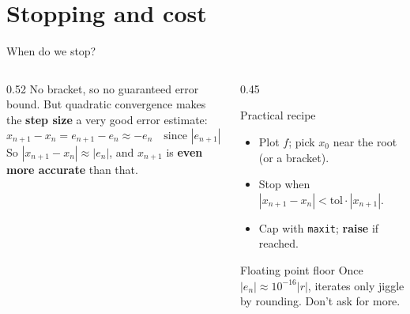 \documentclass[aspectratio=169]{beamer}
\begin{document}
\section{Stopping and cost}

\begin{frame}{When do we stop?}
\begin{columns}[T]
\begin{column}{0.52\textwidth}
\small
No bracket, so no guaranteed error bound. But quadratic convergence makes the \textbf{step size} a very good error estimate:
\[
x_{n+1} - x_n = e_{n+1} - e_n \approx -e_n
\quad\text{since } |e_{n+1}| \ll |e_n|.
\]
So $|x_{n+1} - x_n| \approx |e_n|$, and $x_{n+1}$ is \textbf{even more accurate} than that.
\end{column}
\begin{column}{0.45\textwidth}
\begin{exampleblock}{Practical recipe}
\small
\begin{itemize}
  \item Plot $f$; pick $x_0$ near the root (or a bracket).
  \item Stop when $|x_{n+1} - x_n| < \text{tol}\cdot|x_{n+1}|$.
  \item Cap with \texttt{maxit}; \textbf{raise} if reached.
\end{itemize}
\end{exampleblock}
\begin{alertblock}{Floating point floor}
\scriptsize Once $|e_n| \approx 10^{-16}|r|$, iterates only jiggle by rounding. Don't ask for more.
\end{alertblock}
\end{column}
\end{columns}
\end{frame}
\end{document}
